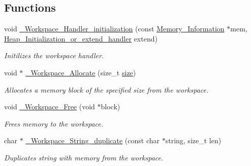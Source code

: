 \subsection*{Functions}
\begin{DoxyCompactItemize}
\item 
void \mbox{\hyperlink{group__RTEMSScoreWorkspace_gac10ac71b406698cb4441aff69a80c847}{\+\_\+\+Workspace\+\_\+\+Handler\+\_\+initialization}} (const \mbox{\hyperlink{structMemory__Information}{Memory\+\_\+\+Information}} $\ast$mem, \mbox{\hyperlink{group__RTEMSScoreHeap_ga8953b692d39ca1c8a2780e9e8e2d9b1f}{Heap\+\_\+\+Initialization\+\_\+or\+\_\+extend\+\_\+handler}} extend)
\begin{DoxyCompactList}\small\item\em Initilizes the workspace handler. \end{DoxyCompactList}\item 
void $\ast$ \mbox{\hyperlink{group__RTEMSScoreWorkspace_ga8b19b310c0e6194a2750c505367d8539}{\+\_\+\+Workspace\+\_\+\+Allocate}} (size\+\_\+t \mbox{\hyperlink{sun4u_2tte_8h_a245260f6f74972558f61b85227df5aae}{size}})
\begin{DoxyCompactList}\small\item\em Allocates a memory block of the specified size from the workspace. \end{DoxyCompactList}\item 
void \mbox{\hyperlink{group__RTEMSScoreWorkspace_gaa33a3d5dcc07a91d0a6ea948eef2f053}{\+\_\+\+Workspace\+\_\+\+Free}} (void $\ast$block)
\begin{DoxyCompactList}\small\item\em Frees memory to the workspace. \end{DoxyCompactList}\item 
char $\ast$ \mbox{\hyperlink{group__RTEMSScoreWorkspace_ga8bc0640d72182fd63475e74dd58c298d}{\+\_\+\+Workspace\+\_\+\+String\+\_\+duplicate}} (const char $\ast$string, size\+\_\+t len)
\begin{DoxyCompactList}\small\item\em Duplicates string with memory from the workspace. \end{DoxyCompactList}\end{DoxyCompactItemize}
